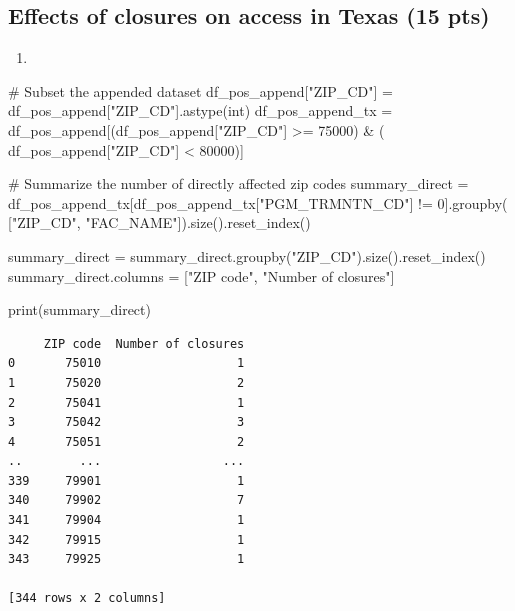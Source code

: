 \documentclass[
  letterpaper,
  DIV=11,
  numbers=noendperiod]{scrartcl}
\newenvironment{Shaded}{\begin{snugshade}}{\end{snugshade}}
\newcommand{\BuiltInTok}[1]{\textcolor[rgb]{0.00,0.23,0.31}{#1}}
\newcommand{\CommentTok}[1]{\textcolor[rgb]{0.37,0.37,0.37}{#1}}
\newcommand{\DecValTok}[1]{\textcolor[rgb]{0.68,0.00,0.00}{#1}}
\newcommand{\NormalTok}[1]{\textcolor[rgb]{0.00,0.23,0.31}{#1}}
\newcommand{\OperatorTok}[1]{\textcolor[rgb]{0.37,0.37,0.37}{#1}}
\newcommand{\StringTok}[1]{\textcolor[rgb]{0.13,0.47,0.30}{#1}}
\providecommand{\tightlist}{%
  \setlength{\itemsep}{0pt}\setlength{\parskip}{0pt}}\usepackage{longtable,booktabs,array}
\begin{document}
\subsection{Effects of closures on access in Texas (15
pts)}\label{effects-of-closures-on-access-in-texas-15-pts}

\begin{enumerate}
\def\labelenumi{\arabic{enumi}.}
\tightlist
\item
\end{enumerate}

\begin{Shaded}
\begin{Highlighting}[]
\CommentTok{\# Subset the appended dataset}
\NormalTok{df\_pos\_append[}\StringTok{"ZIP\_CD"}\NormalTok{] }\OperatorTok{=}\NormalTok{ df\_pos\_append[}\StringTok{"ZIP\_CD"}\NormalTok{].astype(}\BuiltInTok{int}\NormalTok{)}
\NormalTok{df\_pos\_append\_tx }\OperatorTok{=}\NormalTok{ df\_pos\_append[(df\_pos\_append[}\StringTok{"ZIP\_CD"}\NormalTok{] }\OperatorTok{\textgreater{}=} \DecValTok{75000}\NormalTok{) }\OperatorTok{\&}\NormalTok{ (}
\NormalTok{    df\_pos\_append[}\StringTok{"ZIP\_CD"}\NormalTok{] }\OperatorTok{\textless{}} \DecValTok{80000}\NormalTok{)]}

\CommentTok{\# Summarize the number of directly affected zip codes}
\NormalTok{summary\_direct }\OperatorTok{=}\NormalTok{ df\_pos\_append\_tx[df\_pos\_append\_tx[}\StringTok{"PGM\_TRMNTN\_CD"}\NormalTok{] }\OperatorTok{!=} \DecValTok{0}\NormalTok{].groupby(}
\NormalTok{    [}\StringTok{"ZIP\_CD"}\NormalTok{, }\StringTok{"FAC\_NAME"}\NormalTok{]).size().reset\_index()}

\NormalTok{summary\_direct }\OperatorTok{=}\NormalTok{ summary\_direct.groupby(}\StringTok{"ZIP\_CD"}\NormalTok{).size().reset\_index()}
\NormalTok{summary\_direct.columns }\OperatorTok{=}\NormalTok{ [}\StringTok{"ZIP code"}\NormalTok{, }\StringTok{"Number of closures"}\NormalTok{]}

\BuiltInTok{print}\NormalTok{(summary\_direct)}
\end{Highlighting}
\end{Shaded}

\begin{verbatim}
     ZIP code  Number of closures
0       75010                   1
1       75020                   2
2       75041                   1
3       75042                   3
4       75051                   2
..        ...                 ...
339     79901                   1
340     79902                   7
341     79904                   1
342     79915                   1
343     79925                   1

[344 rows x 2 columns]
\end{verbatim}
\end{document}
